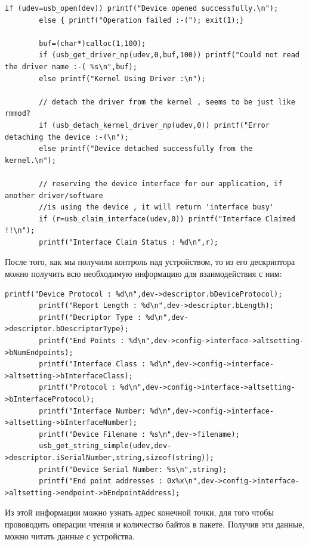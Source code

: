 \documentclass[14pt,a4paper]{article}
\begin{document}
\begin{lstlisting}[language=c caption={Перхват контроля над устройством }]
if (udev=usb_open(dev)) printf("Device opened successfully.\n");
        else { printf("Operation failed :-("); exit(1);}

        buf=(char*)calloc(1,100);
        if (usb_get_driver_np(udev,0,buf,100)) printf("Could not read the driver name :-( %s\n",buf); 
        else printf("Kernel Using Driver :\n");

        // detach the driver from the kernel , seems to be just like rmmod? 
        if (usb_detach_kernel_driver_np(udev,0)) printf("Error detaching the device :-(\n"); 
        else printf("Device detached successfully from the kernel.\n");

        // reserving the device interface for our application, if another driver/software
        //is using the device , it will return 'interface busy'
        if (r=usb_claim_interface(udev,0)) printf("Interface Claimed !!\n"); 
        printf("Interface Claim Status : %d\n",r);
\end{lstlisting}

После того, как мы получили контроль над устройством, то из его дескриптора можно получить всю необходимую информацию для взаимодействия с ним: 

\begin{lstlisting}[language=c caption={Получение информации из дескриптора }]
        printf("Device Protocol : %d\n",dev->descriptor.bDeviceProtocol);
        printf("Report Length : %d\n",dev->descriptor.bLength);
        printf("Decriptor Type : %d\n",dev->descriptor.bDescriptorType);
        printf("End Points : %d\n",dev->config->interface->altsetting->bNumEndpoints);
        printf("Interface Class : %d\n",dev->config->interface->altsetting->bInterfaceClass);
        printf("Protocol : %d\n",dev->config->interface->altsetting->bInterfaceProtocol);
        printf("Interface Number: %d\n",dev->config->interface->altsetting->bInterfaceNumber);
        printf("Device Filename : %s\n",dev->filename);
        usb_get_string_simple(udev,dev->descriptor.iSerialNumber,string,sizeof(string));
        printf("Device Serial Number: %s\n",string);
        printf("End point addresses : 0x%x\n",dev->config->interface->altsetting->endpoint->bEndpointAddress);
\end{lstlisting}

Из этой информации можно узнать адрес конечной точки, для того чтобы прововодить операции чтения и количество байтов в пакете. Получив эти данные, можно читать данные с устройства.
\end{document}

